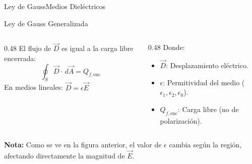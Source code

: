 \documentclass[10pt,aspectratio=169]{beamer}
\begin{document}
\primeraDiapo

\begin{frame}{Ley de Gauss}{Medios Dieléctricos}
    \begin{boxTeoria}{Ley de Gauss Generalizada}
        \begin{columns}[T] %

            \begin{column}{0.48\textwidth}
                El flujo de $\vec{D}$ es igual a la carga libre encerrada:
                \begin{equation*}
                    \oint_S \vec{D} \cdot \, d\vec{A} = Q_{f, \text{enc}}
                \end{equation*}
                En medios lineales: $\vec{D} = \epsilon \vec{E}$
            \end{column}

            \begin{column}{0.48\textwidth}
                Donde:
                \begin{itemize}
                    \item $\vec{D}$: Desplazamiento eléctrico.
                    \item $\epsilon$: Permitividad del medio ($\epsilon_1, \epsilon_2, \epsilon_0$).
                    \item $Q_{f, \text{enc}}$: Carga libre (no de polarización).
                \end{itemize}
            \end{column}

        \end{columns}
    \end{boxTeoria}
    \small \textbf{Nota:} Como se ve en la figura anterior, el valor de $\epsilon$ cambia según la región, afectando directamente la magnitud de $\vec{E}$.
\end{frame}
\end{document}
